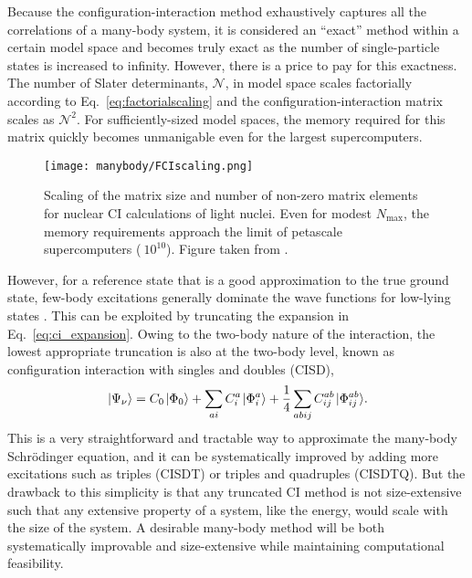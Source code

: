 \documentclass[thesis.tex]{subfiles}
\begin{document}
Because the configuration-interaction method exhaustively captures all the correlations of a many-body system, it is considered an ``exact'' method within a certain model space and becomes truly exact as the number of single-particle states is increased to infinity.  However, there is a price to pay for this exactness.  The number of Slater determinants, $\mathcal{N}$, in model space scales factorially according to Eq.\ \eqref{eq:factorialscaling} and the configuration-interaction matrix scales as $\mathcal{N}^{2}$.  For sufficiently-sized model spaces, the memory required for this matrix quickly becomes unmanigable even for the largest supercomputers.
\begin{figure}
  \centering
  \texttt{[image: manybody/FCIscaling.png]}
  \caption{Scaling of the matrix size and number of non-zero matrix elements for nuclear CI calculations of light nuclei.  Even for modest $N_{\text{max}}$, the memory requirements approach the limit of petascale supercomputers ($~10^{10}$).  Figure taken from \cite{SHAO2016}.}
  \label{fig:fciscaling}
\end{figure}

However, for a reference state that is a good approximation to the true ground state, few-body excitations generally dominate the wave functions for low-lying states \cite{SHERRILL1999143}.  This can be exploited by truncating the expansion in Eq.\ \eqref{eq:ci_expansion}.  Owing to the two-body nature of the interaction, the lowest appropriate truncation is also at the two-body level, known as configuration interaction with singles and doubles (CISD),
\begin{equation} \label{eq:cisd_expansion}
  \ket{\Psi_{\nu}} = C_{0}\ket{\Phi_{0}} + \sum_{\mathclap{a i}} C^{a}_{i}\ket{\Phi^{a}_{i}} + \frac{1}{4}\sum_{\mathclap{a b i j}} C^{ab}_{ij}\ket{\Phi^{ab}_{ij}}.
\end{equation}
This is a very straightforward and tractable way to approximate the many-body Schr\"{o}dinger equation, and it can be systematically improved by adding more excitations such as triples (CISDT) or triples and quadruples (CISDTQ).  But the drawback to this simplicity is that any truncated CI method is not size-extensive such that any extensive property of a system, like the energy, would scale with the size of the system.  A desirable many-body method will be both systematically improvable and size-extensive while maintaining computational feasibility.
\end{document}

